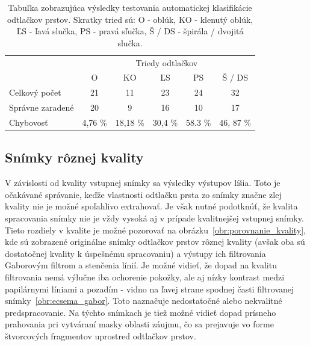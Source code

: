   \begin{table}[ht]
    \centering
    \caption{Tabuľka zobrazujúca výsledky testovania automatickej klasifikácie odtlačkov prstov. Skratky tried sú: O - oblúk, KO - klenutý oblúk,
    ĽS - ľavá slučka, PS - pravá sľučka, Š / DS - špirála / dvojitá slučka.}
    \begin{tabular}{ l | c | c | c | c | c | }
      \cline{2-6}
                                              & \multicolumn{5}{|c|}{Triedy odtlačkov}            \\
      \cline{2-6}
                                              & O       & KO        & ĽS     & PS    & Š / DS     \\
      \hline
      \multicolumn{1}{|l|}{Celkový počet}     & 21      & 11        & 23      & 24    & 32        \\
      \multicolumn{1}{|l|}{Správne zaradené}  & 20      & 9         & 16      & 10    & 17        \\
      \multicolumn{1}{|l|}{Chybovosť}         & 4,76 \% & 18,18 \%  & 30,4 \% & 58.3 \% & 46, 87 \% \\
      \hline
    \end{tabular}
    \label{tab:vysledky_testov}
  \end{table}

  \subsection{Snímky rôznej kvality}
  V závislosti od kvality vstupnej snímky sa výsledky výstupov líšia. Toto je očakávané správanie, keďže vlastnosti odtlačku prsta zo snímky značne zlej
  kvality nie je možné spoľahlivo extrahovať. Je však nutné podotknúť, že kvalita spracovania snímky nie je vždy vysoká aj v prípade kvalitnejšej vstupnej
  snímky. Tieto rozdiely v kvalite je možné pozorovať na obrázku~{\ref{obr:porovnanie_kvality}}, kde sú zobrazené originálne snímky odtlačkov prstov rôznej
  kvality
  (avšak oba sú dostatočnej kvality k úspešnému spracovaniu) a výstupy ich filtrovania Gaborovým filtrom a stenčenia línií. Je možné vidieť, že dopad na kvalitu
  filtrovania nemá výlučne iba ochorenie pokožky, ale aj nízky kontrast medzi papilárnymi líniami a pozadím - vidno na ľavej strane spodnej časti filtrovanej
  snímky~{\ref{obr:ecsema_gabor}}. Toto naznačuje nedostatočné alebo nekvalitné predspracovanie. Na týchto snímkach je tiež možné vidieť dopad prísneho
  prahovania pri vytváraní masky oblasti záujmu, čo sa prejavuje vo forme štvorcových fragmentov uprostred odtlačkov prstov.

